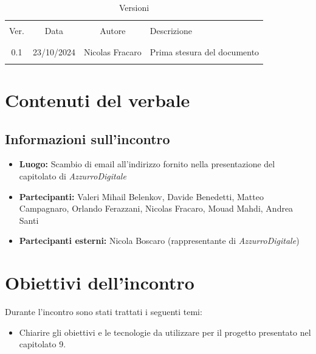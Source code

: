 \documentclass[italian, 12pt]{article}
\begin{document}
\pagestyle{mystyle}


\begin{table}[!h]
	\caption{Versioni}
	\begin{center}
		\begin{tabular}{ c c c p{9cm}}
			\hline \\[-2ex]
			Ver. & Data & Autore & Descrizione \\
			\\[-2ex] \hline \\[-1.5ex]
			0.1 & 23/10/2024 & Nicolas Fracaro& Prima stesura del documento\\
			\\[-1.5ex] \hline
		\end{tabular}
	\end{center}
\end{table}


\tableofcontents
\newpage

\section{Contenuti del verbale}

\subsection{Informazioni sull'incontro}
\begin{itemize}
    \item \textbf{Luogo:} Scambio di email all'indirizzo fornito nella presentazione del capitolato di \textit{AzzurroDigitale}
    \item \textbf{Partecipanti:} Valeri Mihail Belenkov, Davide Benedetti, Matteo Campagnaro, Orlando Ferazzani, Nicolas Fracaro, Mouad Mahdi, Andrea Santi
    \item \textbf{Partecipanti esterni:} Nicola Boscaro (rappresentante di \textit{AzzurroDigitale})
\end{itemize}

\section{Obiettivi dell'incontro}
Durante l'incontro sono stati trattati i seguenti temi:
\begin{itemize}
    \item Chiarire gli obiettivi e le tecnologie da utilizzare per il progetto presentato nel capitolato 9.
\end{itemize}
\end{document}
